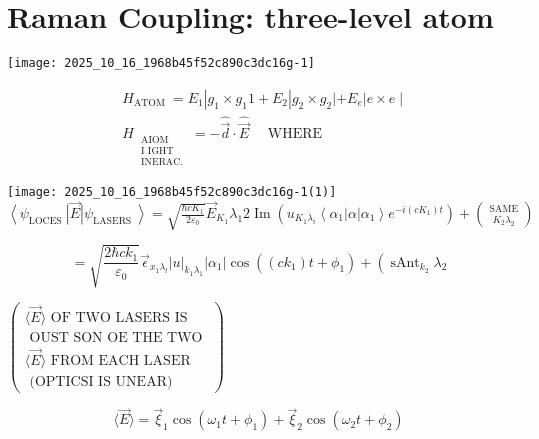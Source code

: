 
\section*{Raman Coupling: three-level atom}
\begin{center}
\texttt{[image: 2025\_10\_16\_1968b45f52c890c3dc16g-1]}
\end{center}

$$
\begin{aligned}
& H_{\text {ATOM }}=E_{1}\left|g_{1} \times g_{1} 1+E_{2}\right| g_{2} \times g_{2}\left|+E_{e}\right| e \times e \mid \\
& H_{\substack{\text { AIOM } \\
\text { I IGHT } \\
\text { INERAC. }}}=-\hat{\vec{d}} \cdot \hat{\vec{E}} \quad \text { WHERE }
\end{aligned}
$$

\texttt{[image: 2025\_10\_16\_1968b45f52c890c3dc16g-1(1)]}\\
$\left\langle\psi_{\text {LOCES }}\right| \vec{E}\left|\psi_{\text {LASERS }}\right\rangle=\sqrt{\frac{\hbar c K_{1}}{2 \varepsilon_{0}}} \vec{E}_{K_{1}} \lambda_{1} 2 \operatorname{Im}\left(u_{K_{1} \lambda_{i}}\left\langle\alpha_{1}\right| \alpha\left|\alpha_{1}\right\rangle e^{-i\left(c K_{1}\right) t}\right)+\binom{\text { SAME }}{K_{2} \lambda_{2}}$

$$
=\sqrt{\frac{2 \hbar c k_{1}}{\varepsilon_{0}}} \vec{\epsilon}_{x_{1} \lambda_{l}}|u|_{k_{1} \lambda_{1}}\left|\alpha_{1}\right| \cos \left(\left(c k_{1}\right) t+\phi_{1}\right)+\left(\operatorname{sAnt}_{k_{2}} \lambda_{2}\right.
$$

$\left(\begin{array}{l}\langle\vec{E}\rangle \text { OF TWO LASERS IS } \\ \text { OUST SON OE THE TWO } \\ \langle\vec{E}\rangle \text { FROM EACH LASER } \\ \text { (OPTICSI IS UNEAR) }\end{array}\right)$

$$
\langle\vec{E}\rangle=\vec{\xi}_{1} \cos \left(\omega_{1} t+\phi_{1}\right)+\vec{\xi}_{2} \cos \left(\omega_{2} t+\phi_{2}\right)
$$

